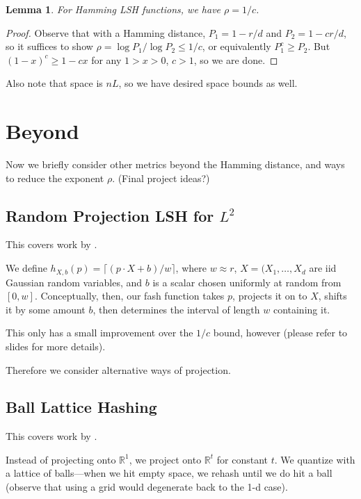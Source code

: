 \documentclass[11pt]{article}
\newtheorem{lemma}[theorem]{Lemma}
\theoremstyle{definition}
\begin{document}
\begin{lemma}
    For Hamming LSH functions, we have $\rho = 1/c$.
\end{lemma}

\begin{proof}
    Observe that with a Hamming distance, $P_1 = 1 - r/d$ and $P_2 = 1 - cr/d$, so it suffices to show $\rho = \log P_1 / \log P_2 \leq 1/c$, or equivalently $P_1^c \geq P_2$. But $(1-x)^c \geq 1-cx$ for any $1 > x > 0$, $c > 1$, so we are done.
\end{proof}

Also note that space is $nL$, so we have desired space bounds as well.

\section{Beyond}

Now we briefly consider other metrics beyond the Hamming distance, and ways to reduce the exponent $\rho$. (Final project ideas?)

\subsection{Random Projection LSH for $L^2$}

This covers work by \cite{diim04}.

We define $h_{X,b}(p) = \lceil (p \cdot X + b)/w \rceil$, where $w \approx r$, $X = (X_1, \ldots, X_d$ are iid Gaussian random variables, and $b$ is a scalar chosen uniformly at random from $[0, w]$. Conceptually, then, our fash function takes $p$, projects it on to $X$, shifts it by some amount $b$, then determines the interval of length $w$ containing it.

This only has a small improvement over the $1/c$ bound, however (please refer to slides for more details).

Therefore we consider alternative ways of projection.

\subsection{Ball Lattice Hashing}

This covers work by \cite{ai06}.

Instead of projecting onto $\mathbb{R}^1$, we project onto $\mathbb{R}^t$ for constant $t$. We quantize with a lattice of balls---when we hit empty space, we rehash until we do hit a ball (observe that using a grid would degenerate back to the 1-d case).
\end{document}
